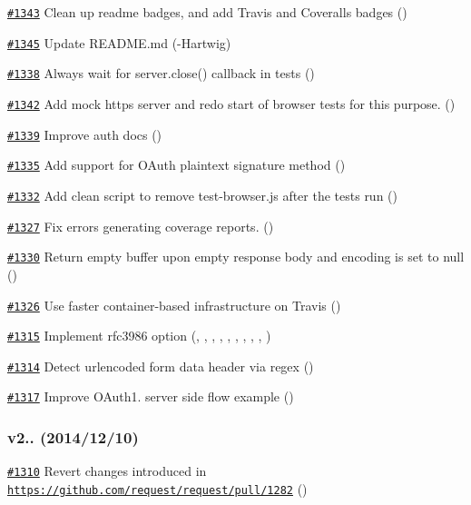 \begin{DoxyItemize}
\item \href{https://github.com/request/request/pull/1343}{\tt \#1343} Clean up readme badges, and add Travis and Coveralls badges ()
\item \href{https://github.com/request/request/pull/1345}{\tt \#1345} Update R\+E\+A\+D\+M\+E.\+md (-\/\+Hartwig)
\item \href{https://github.com/request/request/pull/1338}{\tt \#1338} Always wait for server.\+close() callback in tests ()
\item \href{https://github.com/request/request/pull/1342}{\tt \#1342} Add mock https server and redo start of browser tests for this purpose. ()
\item \href{https://github.com/request/request/pull/1339}{\tt \#1339} Improve auth docs ()
\item \href{https://github.com/request/request/pull/1335}{\tt \#1335} Add support for O\+Auth plaintext signature method ()
\item \href{https://github.com/request/request/pull/1332}{\tt \#1332} Add clean script to remove test-\/browser.\+js after the tests run ()
\item \href{https://github.com/request/request/pull/1327}{\tt \#1327} Fix errors generating coverage reports. ()
\item \href{https://github.com/request/request/pull/1330}{\tt \#1330} Return empty buffer upon empty response body and encoding is set to null ()
\item \href{https://github.com/request/request/pull/1326}{\tt \#1326} Use faster container-\/based infrastructure on Travis ()
\item \href{https://github.com/request/request/pull/1315}{\tt \#1315} Implement rfc3986 option (, , , , , , , , , )
\item \href{https://github.com/request/request/pull/1314}{\tt \#1314} Detect urlencoded form data header via regex ()
\item \href{https://github.com/request/request/pull/1317}{\tt \#1317} Improve O\+Auth1. server side flow example ()
\end{DoxyItemize}

\subsubsection*{v2.. (2014/12/10)}


\begin{DoxyItemize}
\item \href{https://github.com/request/request/pull/1310}{\tt \#1310} Revert changes introduced in \href{https://github.com/request/request/pull/1282}{\tt https\+://github.\+com/request/request/pull/1282} ()
\end{DoxyItemize}

